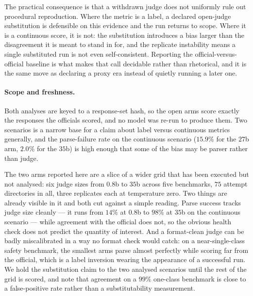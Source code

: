 The practical consequence is that a withdrawn judge does not uniformly rule out
procedural reproduction. Where the metric is a label, a declared open-judge
substitution is defensible on this evidence and the run returns to scope. Where
it is a continuous score, it is not: the substitution introduces a bias larger
than the disagreement it is meant to stand in for, and the replicate instability
means a single substituted run is not even self-consistent. Reporting the
official-versus-official baseline is what makes that call decidable rather than
rhetorical, and it is the same move as declaring a proxy era instead of quietly
running a later one.

\paragraph{Scope and freshness.} Both analyses are keyed to a response-set hash,
so the open arms score exactly the responses the officials scored, and no model
was re-run to produce them. Two scenarios is a narrow base for a claim about
label versus continuous metrics generally, and the parse-failure rate on the
continuous scenario ($15.9\%$ for the $27$b arm, $2.0\%$ for the $35$b) is high
enough that some of the bias may be parser rather than judge.

The two arms reported here are a slice of a wider grid that has been executed but
not analysed: six judge sizes from $0.8$b to $35$b across five benchmarks,
$75$ attempt directories in all, three replicates each at temperature zero. Two
things are already visible in it and both cut against a simple reading. Parse
success tracks judge size cleanly --- it runs from $14\%$ at $0.8$b to $98\%$ at
$35$b on the continuous scenario --- while agreement with the official does not,
so the obvious health check does not predict the quantity of interest. And a
format-clean judge can be badly miscalibrated in a way no format check would
catch: on a near-single-class safety benchmark, the smallest arms parse almost
perfectly while scoring far from the official, which is a label inversion wearing
the appearance of a successful run. We hold the substitution claim to the two
analysed scenarios until the rest of the grid is scored, and note that agreement
on a $99\%$ one-class benchmark is close to a false-positive rate rather than a
substitutability measurement.
\par\smallskip\noindent{}\par\smallskip
